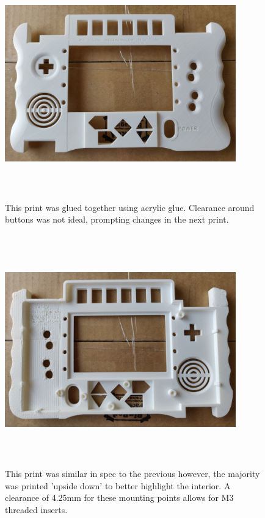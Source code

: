 \begin{figure} [h]
    \centering
    \includegraphics[width=10cm,height=10cm,keepaspectratio]{Figures/secondprint.png}
    \caption{This print was glued together using acrylic glue. Clearance around buttons was not ideal, prompting changes in the next print.}
    \label{fig:Second}
\end{figure}

\begin{figure} [h]
    \centering
    \includegraphics[width=10cm,height=10cm,keepaspectratio]{Figures/secondtothirdprint.png}
    \caption{This print was similar in spec to the previous however, the majority was printed 'upside down' to better highlight the interior. A clearance of 4.25mm for these mounting points allows for M3 threaded inserts.}
    \label{fig:Secondtothird}
\end{figure}


